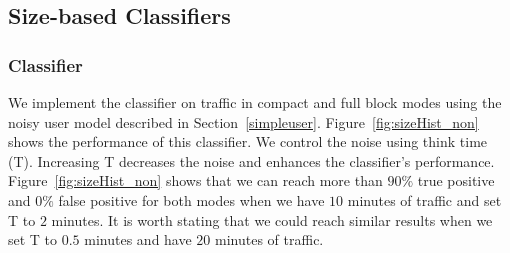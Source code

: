 \begin{comment}
 \begin{figure*}[!t]
\begin{subfigure}{.48\linewidth}
\centering
\texttt{[image: image/jan25/full\_d2u.pdf]}
\caption{Full Mode}
\label{fig:tp}
\end{subfigure}
\centering
\begin{subfigure}{.48\linewidth}
\texttt{[image: image/jan25/cmp\_d2u.pdf]}
\caption{Compact Mode}
\label{fig:fp}
\end{subfigure}
\caption{Result of \code{D2U} classifier on noisy \bc traffic}
\label{fig:d2u}
\end{figure*}
\end{comment}

\subsection{Size-based Classifiers}

\subsubsection{ Classifier}
We implement the  classifier on \bc traffic in compact and full block modes using the noisy user model described in Section~\ref{simpleuser}. Figure~\ref{fig:sizeHist_non} shows the performance of this classifier. We control the noise using think time (T). Increasing T decreases the noise and enhances the classifier's performance. Figure~\ref{fig:sizeHist_non} shows that we can reach more than $90\%$ true positive and $0\%$ false positive for both modes when we have $10$ minutes of traffic and set T to $2$ minutes. It is worth stating that we could reach similar results when we set T to $0.5$ minutes and have $20$ minutes of traffic.

 
